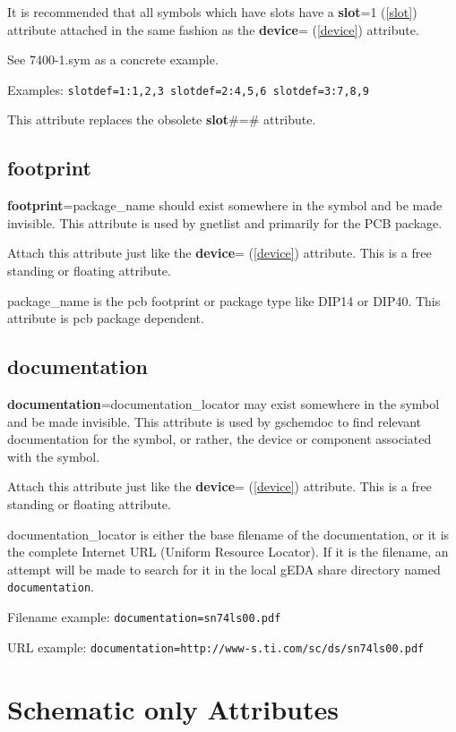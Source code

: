 \documentclass{article}
\begin{document}
It is recommended that all symbols which have slots have a {\bf slot}=1
(\ref{slot}) attribute attached in the same fashion as the {\bf device}=
(\ref{device}) attribute.

See 7400-1.sym as a concrete example.

Examples: \texttt{slotdef=1:1,2,3 slotdef=2:4,5,6 slotdef=3:7,8,9}

This attribute replaces the obsolete {\bf slot}\#=\# attribute.


\subsection{\bf footprint\label{footprint}}
{\bf footprint}=package\_name should exist somewhere in the symbol and
be made invisible.  This attribute is used by gnetlist and primarily
for the PCB package.

Attach this attribute just like the {\bf device}= (\ref{device})
attribute.  This is a free standing or floating attribute.

package\_name is the pcb footprint or package type like DIP14 or DIP40.
This attribute is pcb package dependent.


\subsection{\bf documentation\label{documentation}}
{\bf documentation}=documentation\_locator may exist somewhere in the 
symbol and be made invisible.  This attribute is used by gschemdoc to 
find relevant documentation for the symbol, or rather, the device or 
component associated with the symbol.

Attach this attribute just like the {\bf device}= (\ref{device})
attribute.  This is a free standing or floating attribute.

documentation\_locator is either the base filename of the documentation,
or it is the complete Internet URL (Uniform Resource Locator). If it
is the filename, an attempt will be made to search for it in the local
gEDA share directory named \texttt{documentation}.

Filename example: \texttt{documentation=sn74ls00.pdf}

URL example: \texttt{documentation=http://www-s.ti.com/sc/ds/sn74ls00.pdf}


\section{Schematic only Attributes}
\end{document}
